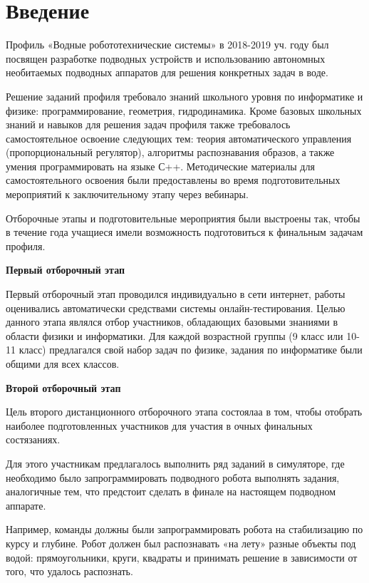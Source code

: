 %
\begingroup
\pagestyle{empty}

\section*{Введение}

Профиль «Водные робототехнические системы» в 2018-2019 уч. году был посвящен разработке подводных устройств и использованию автономных необитаемых подводных аппаратов для решения конкретных задач в воде. 

Решение заданий профиля требовало знаний школьного уровня по информатике и физике: программирование, геометрия, гидродинамика. Кроме базовых школьных знаний и навыков для решения задач профиля также требовалось самостоятельное освоение следующих тем: теория автоматического управления (пропорциональный регулятор), алгоритмы распознавания образов, а также умения программировать на языке С++. Методические материалы для самостоятельного освоения были предоставлены во время подготовительных мероприятий к заключительному этапу через вебинары.

Отборочные этапы и подготовительные мероприятия были выстроены так, чтобы в течение года учащиеся имели возможность подготовиться к финальным задачам профиля.

\textbf{Первый отборочный этап}

Первый отборочный этап проводился индивидуально в сети интернет, работы оценивались автоматически средствами системы онлайн-тестирования. Целью данного этапа являлся отбор участников, обладающих базовыми знаниями в области физики и информатики.  Для каждой возрастной группы (9 класс или 10-11 класс) предлагался свой набор задач по физике, задания по информатике были общими для всех классов. 

\textbf{Второй отборочный этап}

Цель второго дистанционного отборочного этапа состоялаа в том, чтобы отобрать наиболее подготовленных участников для участия в очных финальных состязаниях. 

Для этого участникам предлагалось выполнить ряд заданий в симуляторе, где необходимо было запрограммировать подводного робота выполнять задания, аналогичные тем, что предстоит сделать в финале на настоящем подводном аппарате. 

Например, команды должны были запрограммировать робота на стабилизацию по курсу и глубине. Робот должен был распознавать «на лету» разные объекты под водой: прямоугольники, круги, квадраты и принимать решение в зависимости от того, что удалось распознать.

